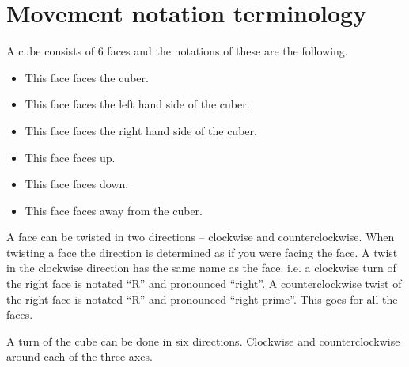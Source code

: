 \section{Movement notation terminology}
\label{sec:moveNotation}
A cube consists of 6 faces and the notations of these are the following.
\begin{itemize}
\item {}This face faces the cuber.
\item {}This face faces the left hand side of the cuber.
\item {}This face faces the right hand side of the cuber.
\item {}This face faces up.
\item {}This face faces down.
\item {}This face faces away from the cuber.
\end{itemize} 

A face can be twisted in two directions -- clockwise and counterclockwise. When twisting a face the direction is determined as if you were facing the face.
A twist in the clockwise direction has the same name as the face. i.e. a clockwise turn of the right face is notated ``R'' and pronounced ``right''.
A counterclockwise twist of the right face is notated ``R'' and pronounced ``right prime''. This goes for all the faces.

A turn of the cube can be done in six directions. Clockwise and counterclockwise around each of the three axes.




